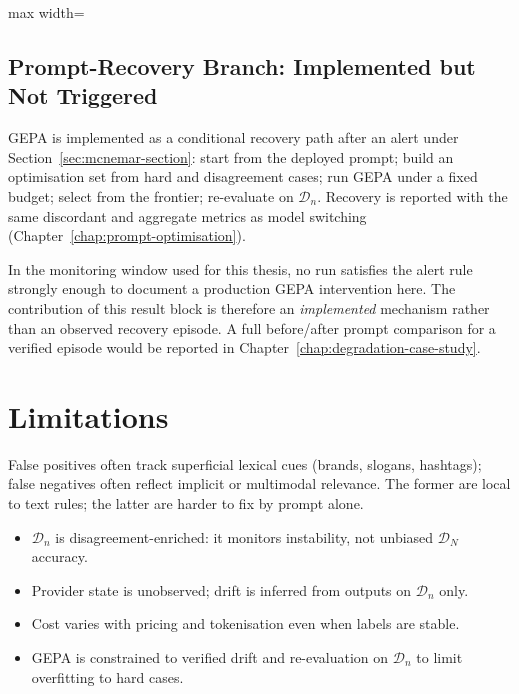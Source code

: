 \begin{table}[htbp]
    \centering
    \footnotesize
    \caption{Exported snapshot of confusion counts and classification metrics per candidate (evaluation on $\mathcal{D}_n$).}
    \label{tab:model-metrics-snapshot}
    \begin{adjustbox}{max width=\linewidth}
    
    \end{adjustbox}
\end{table}

\subsection{Prompt-Recovery Branch: Implemented but Not Triggered}
\label{sec:prompt-recovery-results}

GEPA is implemented as a conditional recovery path after an alert under Section~\ref{sec:mcnemar-section}: start from the deployed prompt; build an optimisation set from hard and disagreement cases; run GEPA under a fixed budget; select from the frontier; re-evaluate on $\mathcal{D}_n$. Recovery is reported with the same discordant and aggregate metrics as model switching (Chapter~\ref{chap:prompt-optimisation}).

In the monitoring window used for this thesis, no run satisfies the alert rule strongly enough to document a production GEPA intervention here. The contribution of this result block is therefore an \emph{implemented} mechanism rather than an observed recovery episode. A full before/after prompt comparison for a verified episode would be reported in Chapter~\ref{chap:degradation-case-study}.

\FloatBarrier

\section{Limitations}
\label{sec:error-analysis}

False positives often track superficial lexical cues (brands, slogans, hashtags); false negatives often reflect implicit or multimodal relevance. The former are local to text rules; the latter are harder to fix by prompt alone.

\begin{itemize}
    \item $\mathcal{D}_n$ is disagreement-enriched: it monitors instability, not unbiased $\mathcal{D}_N$ accuracy.
    \item Provider state is unobserved; drift is inferred from outputs on $\mathcal{D}_n$ only.
    \item Cost varies with pricing and tokenisation even when labels are stable.
    \item GEPA is constrained to verified drift and re-evaluation on $\mathcal{D}_n$ to limit overfitting to hard cases.
\end{itemize}

